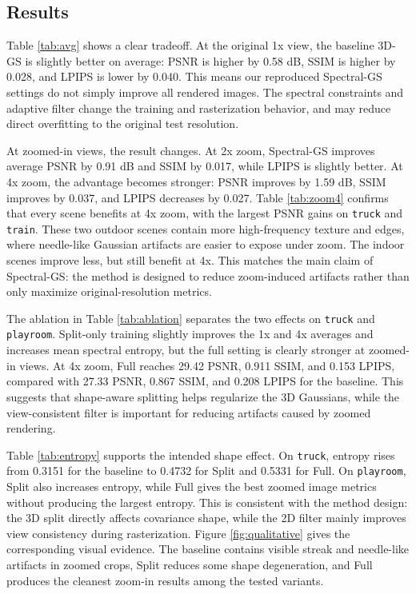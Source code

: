 \documentclass{article}
\begin{document}
\subsection{Results}

Table \ref{tab:avg} shows a clear tradeoff. At the original 1x view, the baseline 3D-GS is slightly better on average: PSNR is higher by 0.58 dB, SSIM is higher by 0.028, and LPIPS is lower by 0.040. This means our reproduced Spectral-GS settings do not simply improve all rendered images. The spectral constraints and adaptive filter change the training and rasterization behavior, and may reduce direct overfitting to the original test resolution.

At zoomed-in views, the result changes. At 2x zoom, Spectral-GS improves average PSNR by 0.91 dB and SSIM by 0.017, while LPIPS is slightly better. At 4x zoom, the advantage becomes stronger: PSNR improves by 1.59 dB, SSIM improves by 0.037, and LPIPS decreases by 0.027. Table \ref{tab:zoom4} confirms that every scene benefits at 4x zoom, with the largest PSNR gains on \texttt{truck} and \texttt{train}. These two outdoor scenes contain more high-frequency texture and edges, where needle-like Gaussian artifacts are easier to expose under zoom. The indoor scenes improve less, but still benefit at 4x. This matches the main claim of Spectral-GS: the method is designed to reduce zoom-induced artifacts rather than only maximize original-resolution metrics.

The ablation in Table \ref{tab:ablation} separates the two effects on \texttt{truck} and \texttt{playroom}. Split-only training slightly improves the 1x and 4x averages and increases mean spectral entropy, but the full setting is clearly stronger at zoomed-in views. At 4x zoom, Full reaches 29.42 PSNR, 0.911 SSIM, and 0.153 LPIPS, compared with 27.33 PSNR, 0.867 SSIM, and 0.208 LPIPS for the baseline. This suggests that shape-aware splitting helps regularize the 3D Gaussians, while the view-consistent filter is important for reducing artifacts caused by zoomed rendering.

Table \ref{tab:entropy} supports the intended shape effect. On \texttt{truck}, entropy rises from 0.3151 for the baseline to 0.4732 for Split and 0.5331 for Full. On \texttt{playroom}, Split also increases entropy, while Full gives the best zoomed image metrics without producing the largest entropy. This is consistent with the method design: the 3D split directly affects covariance shape, while the 2D filter mainly improves view consistency during rasterization. Figure \ref{fig:qualitative} gives the corresponding visual evidence. The baseline contains visible streak and needle-like artifacts in zoomed crops, Split reduces some shape degeneration, and Full produces the cleanest zoom-in results among the tested variants.
\end{document}
